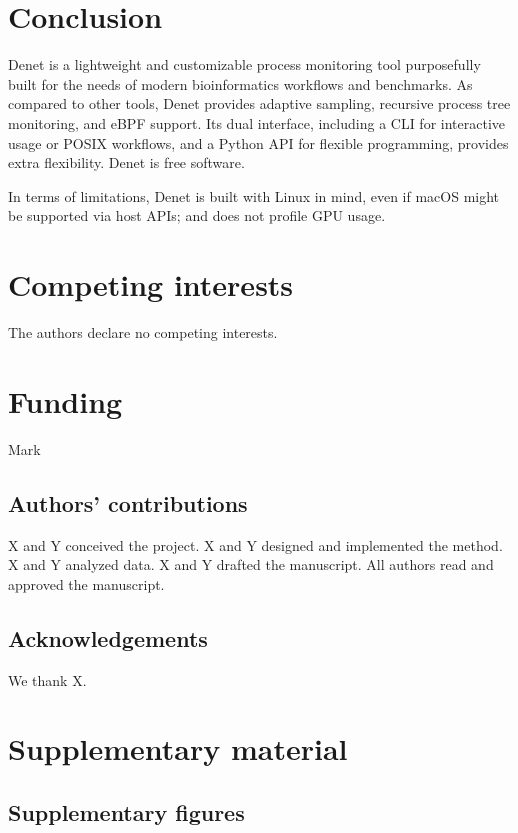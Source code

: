 \documentclass[10pt]{article}
\newcommand{\beginsupplement}{%
        \setcounter{table}{0}
        \renewcommand{\thetable}{S\arabic{table}}%
        \setcounter{figure}{0}
        \renewcommand{\thefigure}{S\arabic{figure}}%
        \setcounter{section}{0}
        \renewcommand{\thesection}{S\arabic{section}}%
      }
\begin{document}
\section{Conclusion}

Denet is a lightweight and customizable process monitoring tool purposefully built for the needs of modern bioinformatics workflows and benchmarks. As compared to other tools, Denet provides adaptive sampling, recursive process tree monitoring, and eBPF support.  Its dual interface, including a CLI for interactive usage or POSIX workflows, and a Python API for flexible programming, provides extra flexibility. Denet is free software.

In terms of limitations, Denet is built with Linux in mind, even if macOS might be supported via host APIs; and does not profile GPU usage.

\section{Competing interests}
The authors declare no competing interests.

\section{Funding}

{\color{red} Mark}

\subsection{Authors' contributions}

X and Y conceived the project. X and Y designed and implemented the method. X and Y analyzed data. X and Y drafted the manuscript. All authors read and approved the manuscript.

\subsection{Acknowledgements}

We thank {\color{red}X}.




\clearpage

\beginsupplement
\section{Supplementary material}  %

\subsection{Supplementary figures}  %
\end{document}
